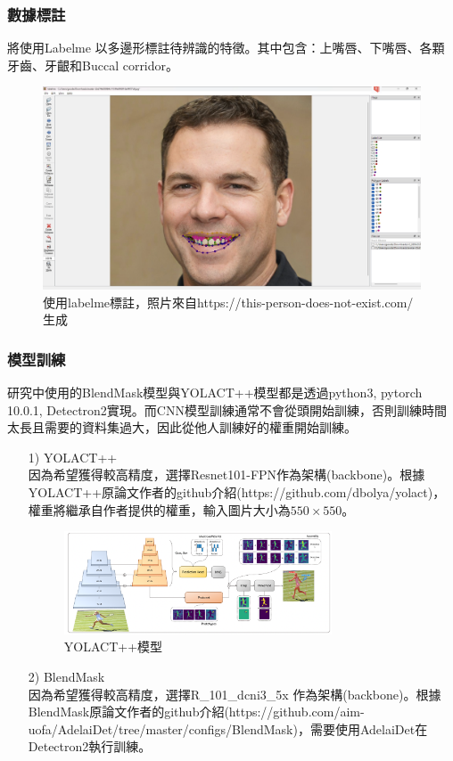 \newpage
\subsubsection{數據標註}
將使用Labelme 以多邊形標註待辨識的特徵。其中包含：上嘴唇、下嘴唇、各顆牙齒、牙齦和Buccal corridor。

\begin{figure}[H]
  \centering
  \includegraphics[width=1\textwidth]{paste_src/2023-02-07-19-16-30.png}
  \caption{使用labelme標註，照片來自https://this-person-does-not-exist.com/ 生成}
  \label{}
\end{figure}


\subsubsection{模型訓練}
研究中使用的BlendMask模型與YOLACT++模型都是透過python3, pytorch 10.0.1, Detectron2實現。而CNN模型訓練通常不會從頭開始訓練，否則訓練時間太長且需要的資料集過大，因此從他人訓練好的權重開始訓練。
\begin{itemize}
\item[1)]YOLACT++\\
因為希望獲得較高精度，選擇Resnet101-FPN作為架構(backbone)。根據YOLACT++原論文作者的github介紹(https://github.com/dbolya/yolact)，權重將繼承自作者提供的權重，輸入圖片大小為$550\times 550$。
\begin{figure}[H]
  \centering
  \includegraphics[width=0.75\textwidth]{paste_src/2023-02-06-21-03-31.png}
  \caption{YOLACT++模型}
  \label{}
\end{figure}
\item[2)]BlendMask\\
因為希望獲得較高精度，選擇R\_101\_dcni3\_5x 作為架構(backbone)。根據BlendMask原論文作者的github介紹(https://github.com/aim-uofa/AdelaiDet/tree/master/configs/BlendMask)，需要使用AdelaiDet在Detectron2執行訓練。
\end{itemize}






